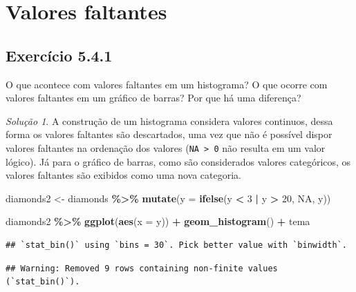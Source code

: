 \documentclass[
]{latex/krantz}
\newenvironment{Shaded}{\begin{snugshade}}{\end{snugshade}}
\newcommand{\AttributeTok}[1]{\textcolor[rgb]{0.13,0.29,0.53}{#1}}
\newcommand{\ConstantTok}[1]{\textcolor[rgb]{0.56,0.35,0.01}{#1}}
\newcommand{\DecValTok}[1]{\textcolor[rgb]{0.00,0.00,0.81}{#1}}
\newcommand{\FunctionTok}[1]{\textcolor[rgb]{0.13,0.29,0.53}{\textbf{#1}}}
\newcommand{\NormalTok}[1]{#1}
\newcommand{\OtherTok}[1]{\textcolor[rgb]{0.56,0.35,0.01}{#1}}
\newcommand{\SpecialCharTok}[1]{\textcolor[rgb]{0.81,0.36,0.00}{\textbf{#1}}}
\theoremstyle{definition}
\theoremstyle{definition}
\theoremstyle{definition}
\theoremstyle{definition}
\theoremstyle{remark}
\newtheorem*{solution}{Solução}
\begin{document}
\hypertarget{valores-faltantes}{%
\section{Valores faltantes}\label{valores-faltantes}}

\hypertarget{exr5-4-1}{%
\subsection*{Exercício 5.4.1}\label{exr5-4-1}}

O que acontece com valores faltantes em um histograma? O que ocorre com valores faltantes em um gráfico de barras? Por que há uma diferença?

\begin{solution}
A construção de um histograma considera valores continuos, dessa forma os valores faltantes são descartados, uma vez que não é possível dispor valores faltantes na ordenação dos valores (\texttt{NA\ \textgreater{}\ 0} não resulta em um valor lógico). Já para o gráfico de barras, como são considerados valores categóricos, os valores faltantes são exibidos como uma nova categoria.

\begin{Shaded}
\begin{Highlighting}[]
\NormalTok{diamonds2 }\OtherTok{\textless{}{-}}\NormalTok{ diamonds }\SpecialCharTok{\%\textgreater{}\%}
                \FunctionTok{mutate}\NormalTok{(}\AttributeTok{y =} \FunctionTok{ifelse}\NormalTok{(y }\SpecialCharTok{\textless{}} \DecValTok{3} \SpecialCharTok{|}\NormalTok{ y }\SpecialCharTok{\textgreater{}} \DecValTok{20}\NormalTok{, }\ConstantTok{NA}\NormalTok{, y))}

\NormalTok{diamonds2 }\SpecialCharTok{\%\textgreater{}\%}
    \FunctionTok{ggplot}\NormalTok{(}\FunctionTok{aes}\NormalTok{(}\AttributeTok{x =}\NormalTok{ y)) }\SpecialCharTok{+}
        \FunctionTok{geom\_histogram}\NormalTok{() }\SpecialCharTok{+}
\NormalTok{        tema}
\end{Highlighting}
\end{Shaded}

\begin{verbatim}
## `stat_bin()` using `bins = 30`. Pick better value with `binwidth`.
\end{verbatim}

\begin{verbatim}
## Warning: Removed 9 rows containing non-finite values (`stat_bin()`).
\end{verbatim}


\end{solution}
\end{document}
